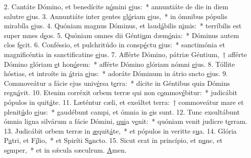 2. Cantáte Dómino, et benedícite n\uline{ó}mini \uline{e}jus:~* annuntiáte de die in diem salutre \uline{e}jus.
3. Annuntiáte inter gentes gl\uline{ó}riam \uline{e}jus,~* in ómnibus pópulis mirabíla \uline{e}jus.
4. Quóniam magnus Dóminus, et laud\uline{á}bilis n\uline{i}mis:~* terríbilis est super mnes d\uline{e}os.
5. Quóniam omnes dii Génti\uline{u}m dæm\uline{ó}nia:~* Dóminus autem clos f\uline{e}cit.
6. Conféssio, et pulchritúdo in consp\uline{é}ctu \uline{e}jus:~* sanctimónia et magnificéntia in sanctificatine \uline{e}jus.
7. Afférte Dómino, pátriæ Géntium,~† afférte Dómino glóriam \uline{e}t hon\uline{ó}rem:~* afférte Dómino glóriam nómni \uline{e}jus.
8. Tóllite hóstias, et introíte in \uline{á}tria \uline{e}jus:~* adoráte Dóminum in átrio sncto \uline{e}jus.
9. Commoveátur a fácie ejus univ\uline{é}rsa t\uline{e}rra:~* dícite in Géntibus quia Dómins regn\uline{á}vit.
10. Etenim corréxit orbem terræ qui non c\uline{o}mmov\uline{é}bitur:~* judicábit pópulos in quit\uline{á}te.
11. Læténtur cæli, et exsúltet terra:~† commoveátur mare et plenit\uline{ú}do \uline{e}jus:~* gaudébunt campi, et ómnia  in \uline{e}is sunt.
12. Tunc exsultábunt ómnia ligna silvárum a fácie Dómini, \uline{qui}a v\uline{e}nit:~* quóniam venit judicre t\uline{e}rram.
13. Judicábit orbem terræ in \uline{æ}quit\uline{á}te,~* et pópulos in veritte s\uline{u}a.
14. Glória P\uline{a}tri, et F\uline{í}lio,~* et Spiríti S\uline{a}ncto.
15. Sicut erat in princípio, et n\uline{u}nc, et s\uline{e}mper,~* et in sǽcula sæculrum. \uline{A}men.
